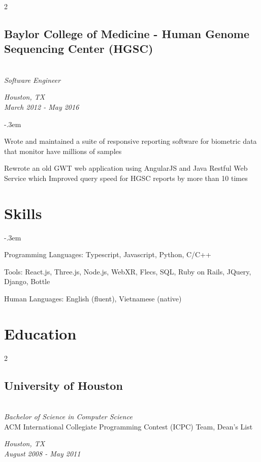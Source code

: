 \documentclass{article}
\let\olditemize=\itemize \let\endolditemize=\enditemize
\renewenvironment{itemize}{\olditemize[topsep=0em] \itemsep-.3em}{\endolditemize}
\newenvironment{twocolentry}[2][]{
    \def\secondColumn{#2}
    \raggedright
    \setcolumnwidth{\fill, 6cm}
    \begin{paracol}{2}
}{
    \switchcolumn \raggedleft \secondColumn
    \end{paracol}
} %
\begin{document}
\begin{twocolentry}{
  \textit{Houston, TX} \\
  \textit{March 2012 - May 2016} \\
}
\subsection{Baylor College of Medicine - Human Genome Sequencing Center (HGSC)}\hfill\\
\textit{Software Engineer}
\end{twocolentry}
\begin{itemize}
  \item Wrote and maintained a suite of responsive reporting software for biometric data that monitor have millions of samples
  \item Rewrote an old GWT web application using AngularJS and Java Restful Web Service which
  Improved query speed for HGSC reports by more than 10 times
\end{itemize}

\section{Skills}
\begin{itemize}
\item Programming Languages: Typescript, Javascript, Python, C/C++
\item Tools: React.js, Three.js, Node.js, WebXR, Flecs, SQL, Ruby on Rails, JQuery, Django, Bottle
\item Human Languages: English (fluent), Vietnamese (native)
\end{itemize}

\section{Education}
\begin{twocolentry}{
  \textit{Houston, TX} \\
  \textit{August 2008 - May 2011} \\
}
\subsection{University of Houston}\hfill\\
\textit{Bachelor of Science in Computer Science}\\
ACM International Collegiate Programming Contest (ICPC) Team, Dean's List
\end{twocolentry}
\end{document}
